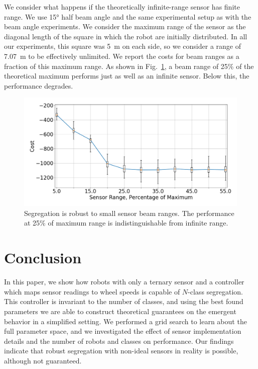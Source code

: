 \documentclass[letterpaper, 10 pt, conference]{ieeeconf}
\begin{document}
  We consider what happens if the theoretically infinite-range sensor has finite
  range. We use \ang{15} half beam angle and the same experimental setup as with
  the beam angle experiments. We consider the maximum range of the sensor as the
  diagonal length of the square in which the robot are initially distributed. In
  all our experiments, this square was \SI{5}{\meter} on each side, so we consider
  a range of \SI{7.07}{\meter} to be effectively unlimited. We report the costs
  for beam ranges as a fraction of this maximum range. As shown in
  Fig.~\ref{fig:beam_range}, a beam range of 25\% of the theoretical maximum
  performs just as well as an infinite sensor. Below this, the performance
  degrades.

  \begin{figure}[t]
    \centering
    \includegraphics[width=1\linewidth]{./images/beam_length.png}
    \caption{Segregation is robust to small sensor beam ranges. The performance at 25\% of maximum range is indistinguishable from infinite range.}
    \label{fig:beam_range}
  \end{figure}

  \section{Conclusion}

  In this paper, we show how robots with only a ternary sensor and a controller
  which maps sensor readings to wheel speeds is capable of $N$-class segregation.
  This controller is invariant to the number of classes, and using the best found parameters
  we are able to construct theoretical guarantees on the emergent behavior in a simplified setting.
  We performed a grid search to learn about the full parameter space, and we
  investigated the effect of sensor implementation details and the number of
  robots and classes on performance. Our findings indicate that robust segregation
  with non-ideal sensors in reality is possible, although not guaranteed.

  
  
\end{document}
